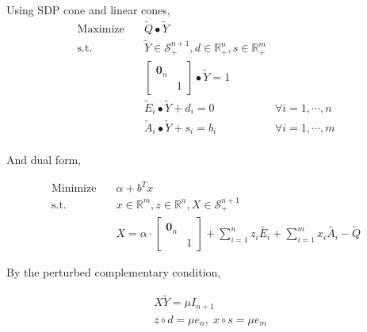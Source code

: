 \documentclass[../main]{subfiles}
\begin{document}
Using SDP cone and linear cones,
\begin{equation} \label{eq:ws.std.primal}
    \begin{aligned}
        \mathrm{Maximize}\quad & \tilde Q \bullet \tilde Y                                                         \\
        \mathrm{s.t.} \quad    & \tilde Y  \in \mathscr S^{n+1}_+, d \in \mathbb{R}^n_+, s
        \in \mathbb{R}^m_+                                                                                         \\
                               & \begin{bmatrix}  \bm 0_n &  \\  & 1  \end{bmatrix} \bullet \tilde Y = 1                                   \\
                               & \tilde E_i \bullet \tilde Y + d_i = 0                     & \forall i=1,\cdots, n \\
                               & \tilde A_i \bullet \tilde Y + s_i = b_i                   & \forall i=1,\cdots, m \\
    \end{aligned}
\end{equation}

And dual form,

\begin{equation} \label{eq:ws.std.dual}
    \begin{aligned}
        \mathrm{Minimize} \quad & \alpha + b^Tx                                                    \\
        \mathrm{s.t.} \quad     & x \in \mathbb{R}^m, z\in \mathbb{R}^n, X  \in \mathscr S^{n+1}_+ \\
                                & X =\alpha \cdot \begin{bmatrix}  \bm 0_n &  \\  & 1  \end{bmatrix}
        + \sum_{i=1}^{n} z_{i} \tilde{E_i}
        + \sum_{i=1}^{m} x_{i} \tilde{A_i}
        - \tilde{Q}
    \end{aligned}
\end{equation}

By the perturbed complementary condition,

\begin{equation} \label{eq:ws.std.lc}
    \begin{aligned}
         & X \tilde Y = \mu I_{n+1}                     \\
         & z \circ d =  \mu e_n, \; x \circ s = \mu e_m
    \end{aligned}
\end{equation}
\end{document}
